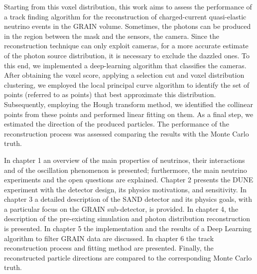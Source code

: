 Starting from this voxel distribution, this work aims to assess the performance of a track finding algorithm for the reconstruction of charged-current quasi-elastic neutrino events in the GRAIN volume. Sometimes, the photons can be produced in the region between the mask and the sensors,  the camera. Since the reconstruction technique can only exploit  cameras, for a more accurate estimate of the photon source distribution, it is necessary to exclude the dazzled ones. To this end, we implemented a deep-learning algorithm that classifies the cameras. 
After obtaining the voxel score, applying a selection cut and voxel distribution clustering, we employed the local principal curve algorithm to identify the set of points (referred to as \lpc points) that best approximate this distribution. Subsequently, employing the Hough transform method, we identified the collinear points from these \lpc points and performed linear fitting on them.
As a final step, we estimated the direction of the produced particles. The performance of the reconstruction process was assessed comparing the results with the Monte Carlo truth.

In chapter 1 an overview of the main properties of neutrinos, their interactions  and of the oscillation phenomenon is presented; furthermore, the main neutrino experiments and the open questions are explained. Chapter 2 presents the DUNE experiment with the detector design, its physics motivations, and sensitivity. In chapter 3 a detailed description of the SAND detector and its physics goals, with a particular focus on the GRAIN sub-detector, is provided. In chapter 4, the description of the pre-existing simulation and photon distribution reconstruction is presented. In chapter 5 the implementation and the results of a Deep Learning algorithm to filter GRAIN data are discussed. In chapter 6 the track reconstruction process and fitting method are presented. Finally, the reconstructed particle directions are compared to the corresponding Monte Carlo truth.

